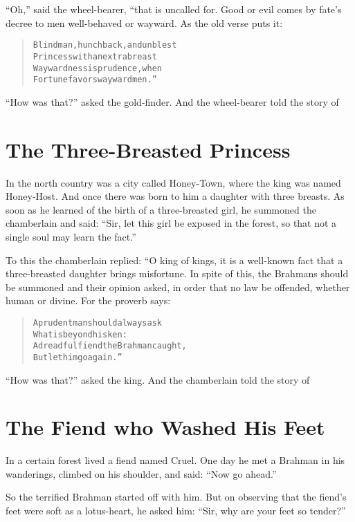 \documentclass[article, twoside, 14pt]{memoir}
\renewenvironment{verbatim}{%
\begin{quote}%
\vskip -10pt%
\begin{alltt}\normalfont\large}{\end{alltt}%
\end{quote}%
\vskip -10pt
} %
\begin{document}
``Oh,'' said the wheel-bearer, “that is uncalled for. Good or evil
comes by fate's decree to men well-behaved or wayward. As the old
verse puts it:

\begin{verbatim}
Blind man, hunchback, and unblest
Princess with an extra breast{\textemdash}
Waywardness is prudence, when
Fortune favors wayward men.”
\end{verbatim}
``How was that?'' asked the gold-finder. And the wheel-bearer told
the story of

\chapter{The Three-Breasted Princess}

\label{s89}

In the north country was a city called Honey-Town, where the king
was named Honey-Host. And once there was born to him a daughter
with three breasts. As soon as he learned of the birth of a
three-breasted girl, he summoned the chamberlain and said:
``Sir, let this girl be exposed in the forest, so that not a single soul may learn the fact.''

To this the chamberlain replied: “O king of kings, it is a
well-known fact that a three-breasted daughter brings misfortune.
In spite of this, the Brahmans should be summoned and their opinion
asked, in order that no law be offended, whether human or divine.
For the proverb says:

\begin{verbatim}
A prudent man should always ask
    What is beyond his ken:
A dreadful fiend the Brahman caught,
    But let him go again.”
\end{verbatim}
``How was that?'' asked the king. And the chamberlain told the
story of

\chapter{The Fiend who Washed His Feet}

\label{s90}

In a certain forest lived a fiend named Cruel. One day he met a
Brahman in his wanderings, climbed on his shoulder, and said:
``Now go ahead.''

So the terrified Brahman started off with him. But on observing
that the fiend's feet were soft as a lotus-heart, he asked him:
``Sir, why are your feet so tender?''
\end{document}
